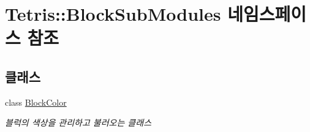 \hypertarget{namespace_tetris_1_1_block_sub_modules}{}\section{Tetris\+:\+:Block\+Sub\+Modules 네임스페이스 참조}
\label{namespace_tetris_1_1_block_sub_modules}
\subsection*{클래스}
\begin{DoxyCompactItemize}
\item 
class \hyperlink{class_tetris_1_1_block_sub_modules_1_1_block_color}{Block\+Color}
\begin{DoxyCompactList}\small\item\em 블럭의 색상을 관리하고 불러오는 클래스 \end{DoxyCompactList}\end{DoxyCompactItemize}
